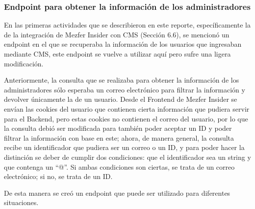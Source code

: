 \subsubsection{Endpoint para obtener la información de los administradores}
En las primeras actividades que se describieron en este reporte, específicamente la de la integración de Mezfer Insider con CMS (Sección 6.6), se mencionó un endpoint en el que se recuperaba la información de los usuarios que ingresaban mediante CMS, este endpoint se vuelve a utilizar aquí pero sufre una ligera modificación.

Anteriormente, la consulta que se realizaba para obtener la información de los administradores sólo esperaba un correo electrónico para filtrar la información y devolver únicamente la de un usuario. Desde el Frontend de Mezfer Insider se envían las cookies del usuario que contienen cierta información que pudiera servir para el Backend, pero estas cookies no contienen el correo del usuario, por lo que la consulta debió ser modificada para también poder aceptar un ID y poder filtrar la información con base en este; ahora, de manera general, la consulta recibe un identificador que pudiera ser un correo o un ID, y para poder hacer la distinción se deber de cumplir dos condiciones: que el identificador sea un string y que contenga un ``@''. Si ambas condiciones son ciertas, se trata de un correo electrónico; si no, se trata de un ID.\@

De esta manera se creó un endpoint que puede ser utilizado para diferentes situaciones.